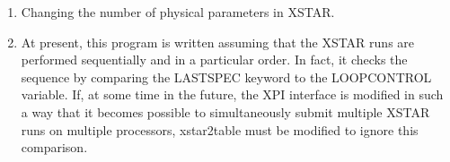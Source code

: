 \begin{enumerate}
	\item  Changing the number of physical parameters in XSTAR.

	\item  At present, this program is written assuming that the XSTAR runs are 
performed sequentially and in a particular order.  In fact, it checks the 
sequence by comparing the LASTSPEC keyword to the LOOPCONTROL variable.
If, at some time in the future, the XPI interface is modified in such 
a way that it becomes possible to simultaneously submit multiple XSTAR 
runs on multiple processors, xstar2table must be modified to ignore 
this comparison.

\end{enumerate}
